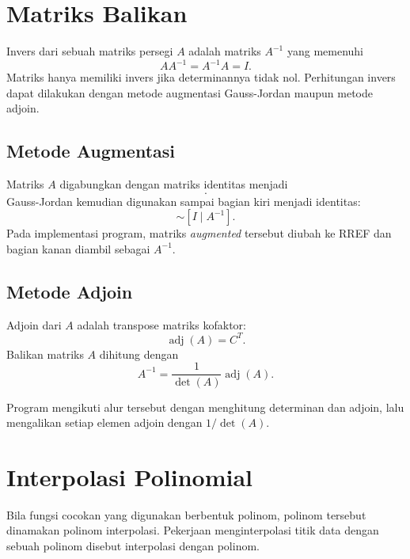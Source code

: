\documentclass[12pt,a4paper]{report}
\begin{document}
\section{Matriks Balikan}

Invers dari sebuah matriks persegi $A$ adalah matriks $A^{-1}$ yang memenuhi
\begin{equation*}
AA^{-1}=A^{-1}A=I.
\end{equation*}
Matriks hanya memiliki invers jika determinannya tidak nol. Perhitungan invers dapat dilakukan dengan metode augmentasi Gauss-Jordan maupun metode adjoin. \cite{tubes}

\subsection{Metode Augmentasi}

Matriks $A$ digabungkan dengan matriks identitas menjadi
\begin{equation*}
[A\mid I].
\end{equation*}
Gauss-Jordan kemudian digunakan sampai bagian kiri menjadi identitas:
\begin{equation*}
[A\mid I]\sim[I\mid A^{-1}].
\end{equation*}
Pada implementasi program, matriks \textit{augmented} tersebut diubah ke RREF dan bagian kanan diambil sebagai $A^{-1}$.

\subsection{Metode Adjoin}

Adjoin dari $A$ adalah transpose matriks kofaktor:
\begin{equation*}
\operatorname{adj}(A)=C^T.
\end{equation*}
Balikan matriks $A$ dihitung dengan
\begin{equation*}
A^{-1}=\frac{1}{\det(A)}\operatorname{adj}(A).
\end{equation*}
\cite{pakrin-det2}

Program mengikuti alur tersebut dengan menghitung determinan dan adjoin, lalu mengalikan setiap elemen adjoin dengan $1/\det(A)$.

\section{Interpolasi Polinomial}

Bila fungsi cocokan yang digunakan berbentuk polinom, polinom tersebut dinamakan polinom interpolasi. Pekerjaan menginterpolasi titik data dengan sebuah polinom disebut interpolasi dengan polinom. \cite{pakrin-interpolasi}
\end{document}
